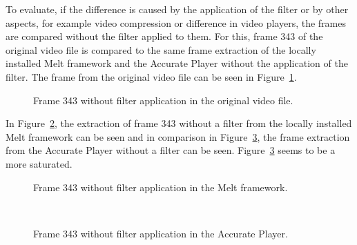 \documentclass[../MasterThesis.tex]{subfiles}
\begin{document}
To evaluate, if the difference is caused by the application of the filter or by other aspects, for example video compression or difference in video players, the frames are compared without the filter applied to them. For this, frame 343 of the original video file is compared to the same frame extraction of the locally installed Melt framework and the Accurate Player without the application of the filter. The frame from the original video file can be seen in Figure~\ref{figure:nofilterO}.

\begin{figure}[H]
	\begin{center}
		\caption[Frame 343 without filter application in the original video file.]{Frame 343 without filter application in the original video file.}
		\label{figure:nofilterO}
	\end{center}
\end{figure}


In Figure~\ref{figure:nofilterMelt}, the extraction of frame 343 without a filter from the locally installed Melt framework can be seen and in comparison in Figure~\ref{figure:nofilterAP}, the frame extraction from the Accurate Player without a filter can be seen. Figure~\ref{figure:nofilterAP} seems to be a more saturated.


\begin{minipage}{0.48\textwidth}
	\begin{figure}[H]
		\begin{center}
			\caption[Frame 343 without filter application in the Melt framework.]{Frame 343 without filter application in the Melt framework.}
			\label{figure:nofilterMelt}
		\end{center}
	\end{figure}
\end{minipage}\begin{minipage}{0.04\textwidth}
	\ 
\end{minipage}\begin{minipage}{0.48\textwidth}
	\begin{figure}[H]
		\begin{center}
			\caption[Frame 343 without filter application in the Accurate Player.]{Frame 343 without filter application in the Accurate Player.}
			\label{figure:nofilterAP}
		\end{center}
	\end{figure}
\end{minipage}
\end{document}
